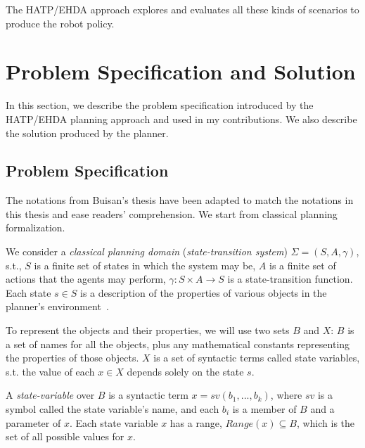 The HATP/EHDA approach explores and evaluates all these kinds of scenarios to produce the robot policy.


\section{Problem Specification and Solution}

In this section, we describe the problem specification introduced by the HATP/EHDA planning approach and used in my contributions. We also describe the solution produced by the planner.  

\subsection*{Problem Specification}
\label{sec:problem_spec}

The notations from Buisan's thesis have been adapted to match the notations in this thesis and ease readers' comprehension. We start from classical planning formalization.

We consider a \textit{classical planning domain} (\textit{state-transition system}) $\Sigma = (S, A,\gamma)$, s.t., $S$ is a finite set of states in which the system may be, $A$ is a finite set of actions that the agents may perform, $\gamma: S \times A \rightarrow S$ is a state-transition function. Each state $s \in S$ is a description of the properties of various objects in the planner's environment~\cite{ghallab2016automated}. 

To represent the objects and their properties, we will use two sets $B$ and $X$: $B$ is a set of names for all the objects, plus any mathematical constants representing the properties of those objects. $X$ is a set of syntactic terms called state variables, s.t. the value of each $x \in X$ depends solely on the state $s$.

A \textit{state-variable} over $B$ is a syntactic term $x = sv(b_1, ..., b_k)$, where $sv$ is a symbol called the state variable's name, and each $b_i$ is a member of $B$ and a parameter of $x$. Each state variable $x$ has a range, $\textit{Range}(x) \subseteq B$, which is the set of all possible values for $x$.


